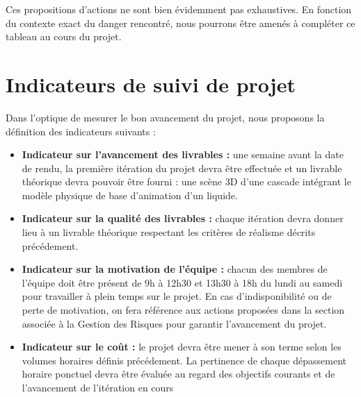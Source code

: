 \documentclass[a4paper,11pt]{article}
\begin{document}
Ces propositions d'actions ne sont bien évidemment pas exhaustives. En fonction du contexte exact du danger rencontré, nous pourrons être amenés à compléter ce tableau au cours du projet.

\section{Indicateurs de suivi de projet}

Dans l'optique de mesurer le bon avancement du projet, nous proposons la définition des indicateurs suivants :
\begin{itemize}
\item \textbf{Indicateur sur l'avancement des livrables : } une semaine avant la date de rendu, la première itération du projet devra être effectuée et un livrable théorique devra pouvoir être fourni : une scène 3D d'une cascade intégrant le modèle physique de base d'animation d'un liquide. 
\item \textbf{Indicateur sur la qualité des livrables : } chaque itération devra donner lieu à un livrable théorique respectant les critères de réalisme décrits précédement.
\item \textbf{Indicateur sur la motivation de l'équipe : } chacun des membres de l'équipe doit être présent de 9h à 12h30 et 13h30 à 18h du lundi au samedi pour travailler à plein temps sur le projet. En cas d'indisponibilité ou de perte de motivation, on fera référence aux actions proposées dans la section associée à la Gestion des Risques pour garantir l'avancement du projet.
\item \textbf{Indicateur sur le coût : } le projet devra être mener à son terme selon les volumes horaires définis précédement. La pertinence de chaque dépassement horaire ponctuel devra être évaluée au regard des objectifs courants et de l'avancement de l'itération en cours

\end{itemize}
\end{document}
